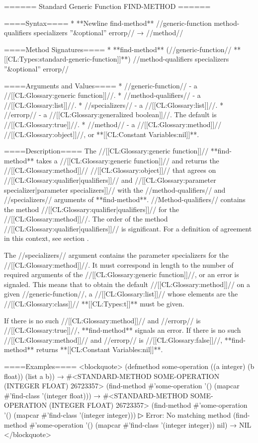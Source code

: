 ====== Standard Generic Function FIND-METHOD ======

====Syntax====
  * **Newline find-method** //generic-function method-qualifiers specializers ''&optional'' errorp// → //method//

====Method Signatures====
  * **find-method** (//generic-function// **[[CL:Types:standard-generic-function]]**) //method-qualifiers specializers ''&optional'' errorp//

====Arguments and Values====
  * //generic-function// - a //[[CL:Glossary:generic function]]//.
  * //method-qualifiers// - a //[[CL:Glossary:list]]//.
  * //specializers// - a //[[CL:Glossary:list]]//.
  * //errorp// - a //[[CL:Glossary:generalized boolean]]//. The default is //[[CL:Glossary:true]]//.
  * //method// - a //[[CL:Glossary:method]]// //[[CL:Glossary:object]]//, or **[[CL:Constant Variables:nil]]**.

====Description====
The //[[CL:Glossary:generic function]]// **find-method** takes a //[[CL:Glossary:generic function]]// and returns the //[[CL:Glossary:method]]// //[[CL:Glossary:object]]// that agrees on //[[CL:Glossary:qualifier|qualifiers]]// and //[[CL:Glossary:parameter specializer|parameter specializers]]// with the //method-qualifiers// and //specializers// arguments of **find-method**. //Method-qualifiers// contains the method //[[CL:Glossary:qualifier|qualifiers]]// for the //[[CL:Glossary:method]]//. The order of the method //[[CL:Glossary:qualifier|qualifiers]]// is significant. For a definition of agreement in this context, see section {\secref\SpecializerQualifierAgreement}.

The //specializers// argument contains the parameter specializers for the //[[CL:Glossary:method]]//. It must correspond in length to the number of required arguments of the //[[CL:Glossary:generic function]]//, or an error is signaled. This means that to obtain the default //[[CL:Glossary:method]]// on a given //generic-function//, a //[[CL:Glossary:list]]// whose elements are the //[[CL:Glossary:class]]// **[[CL:Types:t]]** must be given.

If there is no such //[[CL:Glossary:method]]// and //errorp// is //[[CL:Glossary:true]]//, **find-method** signals an error. If there is no such //[[CL:Glossary:method]]// and //errorp// is //[[CL:Glossary:false]]//, **find-method** returns **[[CL:Constant Variables:nil]]**.

====Examples====
<blockquote> (defmethod some-operation ((a integer) (b float)) (list a b)) → #<STANDARD-METHOD SOME-OPERATION (INTEGER FLOAT) 26723357> (find-method #'some-operation '() (mapcar #'find-class '(integer float))) → #<STANDARD-METHOD SOME-OPERATION (INTEGER FLOAT) 26723357> (find-method #'some-operation '() (mapcar #'find-class '(integer integer)))
▷ Error: No matching method (find-method #'some-operation '() (mapcar #'find-class '(integer integer)) nil) → NIL </blockquote>

